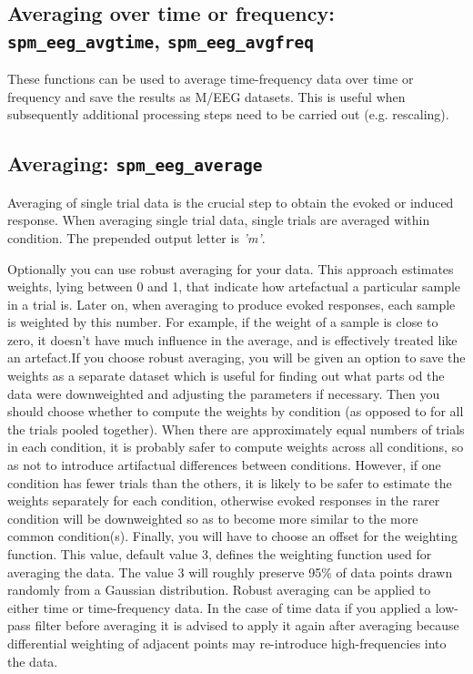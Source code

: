 \subsection{Averaging over time or frequency: \texttt{spm\_eeg\_avgtime}, \texttt{spm\_eeg\_avgfreq}}
These functions can be used to average time-frequency data over time or frequency and save the results as M/EEG datasets.  This is useful when subsequently additional processing steps need to be carried out (e.g. rescaling).

\subsection{Averaging: \texttt{spm\_eeg\_average}}
Averaging of single trial data is the crucial step to obtain the evoked or induced response. When averaging single trial data, single trials are averaged within condition. The prepended output letter is \textit{'m'}.

Optionally you can use robust averaging for your data. This approach estimates weights, lying between 0 and 1, that indicate how artefactual a particular sample in a trial is. Later on, when averaging to produce evoked responses, each sample is weighted by this number. For example, if the weight of a sample is close to zero, it doesn't have much influence in the average, and is effectively treated like an artefact.If you choose robust averaging, you will be given an option to save the weights as a separate dataset which is useful for finding out what parts od the data were downweighted and adjusting the parameters if necessary. Then you should choose whether to compute the weights by condition (as opposed to for all the trials pooled together). When there are approximately equal numbers of trials in each condition, it is probably safer to compute weights across all conditions, so as not to introduce artifactual differences between conditions. However, if one condition has fewer trials than the others, it is likely to be safer to estimate the weights separately for each condition, otherwise evoked responses in the rarer condition will be downweighted so as to become more similar to the more common condition(s). Finally, you will have to choose an offset for the weighting function. This value, default value 3, defines the weighting function used for averaging the data. The value 3 will roughly preserve 95\% of data points drawn randomly from a Gaussian distribution. Robust averaging can be applied to either time or time-frequency data. In the case of time data if you applied a low-pass filter before averaging it is advised to apply it again after averaging because differential weighting of adjacent points may re-introduce high-frequencies into the data. 

